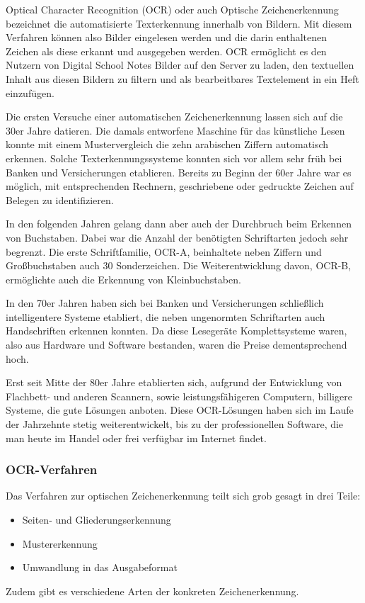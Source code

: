 Optical Character Recognition (OCR) oder auch Optische Zeichenerkennung bezeichnet die automatisierte Texterkennung innerhalb von Bildern. Mit diesem Verfahren können also Bilder eingelesen werden und die darin enthaltenen Zeichen als diese erkannt und ausgegeben werden. OCR ermöglicht es den Nutzern von Digital School Notes Bilder auf den Server zu laden, den textuellen Inhalt aus diesen Bildern zu filtern und als bearbeitbares Textelement in ein Heft einzufügen.


Die ersten Versuche einer automatischen Zeichenerkennung lassen sich auf die 30er Jahre datieren. Die damals entworfene Maschine für das künstliche Lesen konnte mit einem Mustervergleich die zehn arabischen Ziffern automatisch erkennen. Solche Texterkennungssysteme konnten sich vor allem sehr früh bei Banken und Versicherungen etablieren. Bereits zu Beginn der 60er Jahre war es möglich, mit entsprechenden Rechnern, geschriebene oder gedruckte Zeichen auf Belegen zu identifizieren.

In den folgenden Jahren gelang dann aber auch der Durchbruch beim Erkennen von Buchstaben. Dabei war die Anzahl der benötigten Schriftarten jedoch sehr begrenzt. Die erste Schriftfamilie, OCR-A, beinhaltete neben Ziffern und Großbuchstaben auch 30 Sonderzeichen. Die Weiterentwicklung davon, OCR-B, ermöglichte auch die Erkennung von Kleinbuchstaben. \cite{OCRB}

In den 70er Jahren haben sich bei Banken und Versicherungen schließlich intelligentere Systeme etabliert, die neben ungenormten Schriftarten auch Handschriften erkennen konnten. Da diese Lesegeräte Komplettsysteme waren, also aus Hardware und Software bestanden, waren die Preise dementsprechend hoch.

Erst seit Mitte der 80er Jahre etablierten sich, aufgrund der Entwicklung von Flachbett- und anderen Scannern, sowie leistungsfähigeren Computern, billigere Systeme, die gute Lösungen anboten. Diese OCR-Lösungen haben sich im Laufe der Jahrzehnte stetig weiterentwickelt, bis zu der professionellen Software, die man heute im Handel oder frei verfügbar im Internet findet. \cite{OCRB}

\subsubsection{OCR-Verfahren}
Das Verfahren zur optischen Zeichenerkennung teilt sich grob gesagt in drei Teile:
\begin{itemize}
\item Seiten- und Gliederungserkennung
\item Mustererkennung
\item Umwandlung in das Ausgabeformat
\end{itemize}
Zudem gibt es verschiedene Arten der konkreten Zeichenerkennung. \cite{OCRB}

